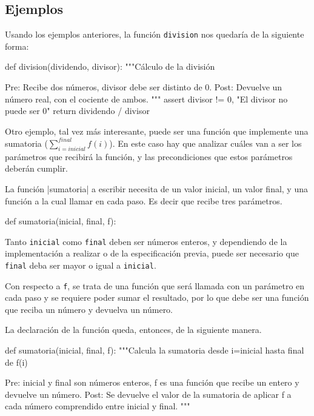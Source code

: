 \subsection{Ejemplos}

Usando los ejemplos anteriores, la función \lstinline!division! nos
quedaría de la siguiente forma:

\begin{codigo-python-sn}
def division(dividendo, divisor):
    """Cálculo de la división

    Pre: Recibe dos números, divisor debe ser distinto de 0.
    Post: Devuelve un número real, con el cociente de ambos.
    """
    assert divisor != 0, "El divisor no puede ser 0"
    return dividendo / divisor
\end{codigo-python-sn}

Otro ejemplo, tal vez más interesante, puede ser una función que implemente
una sumatoria ($\sum_{i=inicial}^{final} f(i)$).  En este caso hay que
analizar cuáles van a ser los parámetros que recibirá la función, y las
precondiciones que estos parámetros deberán cumplir.

La función |sumatoria| a escribir necesita de un valor inicial, un valor
final, y una función a la cual llamar en cada paso. Es decir que recibe
tres parámetros.

\begin{codigo-python-sn}
def sumatoria(inicial, final, f):
\end{codigo-python-sn}

Tanto \lstinline!inicial! como \lstinline!final! deben ser números enteros,
y dependiendo de la implementación a realizar o de la especificación
previa, puede ser necesario que \lstinline!final! deba ser mayor o igual a
\lstinline!inicial!.

Con respecto a \lstinline!f!, se trata de una función que será llamada con
un parámetro en cada paso y se requiere poder sumar el resultado, por lo
que debe ser una función que reciba un número y devuelva un número.

La declaración de la función queda, entonces, de la siguiente manera.

\begin{codigo-python-sn}
def sumatoria(inicial, final, f):
    """Calcula la sumatoria desde i=inicial hasta final de f(i)

    Pre: inicial y final son números enteros, f es una función que
         recibe un entero y devuelve un número.
    Post: Se devuelve el valor de la sumatoria de aplicar f a cada
          número comprendido entre inicial y final.
    """
\end{codigo-python-sn}

